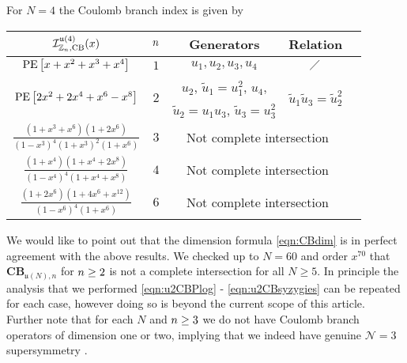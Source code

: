 \documentclass[main.tex]{subfiles}
\begin{document}
\vspace{0.1cm}
For $N=4$ the Coulomb branch index is given by
\vspace{0.1cm}
\begin{center}
\begin{tabular}{|c|c|c|c|c|}
\hline
$\mathcal{I}_{\mathbb{Z}_{n},\text{CB}}^{\mathfrak{u}(4)}(x)$&${n}$&Generators&Relation\\\hline
$\operatorname{\mathrm{PE}}\left[x+x^2+x^3+x^4\right]$ & $1$ &$u_1,u_2,u_3,u_4$&$\diagup$\\\hline
\multirow{ 2}{*}{$\operatorname{\mathrm{PE}}\left[2x^2+2x^4+x^6-x^8\right]$} & \multirow{ 2}{*}{$2$}&$u_2$, $\widetilde{u}_1=u_1^2$, $u_4$, &\multirow{ 2}{*}{$\widetilde{u}_1\widetilde{u}_3=\widetilde{u}_2^2$}\\
&&$\widetilde{u}_2=u_1u_3$, $\widetilde{u}_3=u_3^2$&\\\hline
$\frac{(1+x^3+x^6)(1+2x^6)}{(1-x^3)^4(1+x^3)^2(1+x^6)}$&$3$&\multicolumn{2}{c|}{Not complete intersection}\\\hline
$\frac{(1+x^4)(1+x^4+2x^8)}{\left(1-x^4\right)^4(1+x^4+x^8)}$&$4$&\multicolumn{2}{c|}{Not complete intersection}\\\hline
$\frac{(1+2x^6)(1+4x^6+x^{12})}{\left(1-x^6\right)^4(1+x^6)}$&$6$&\multicolumn{2}{c|}{Not complete intersection}\\\hline
\end{tabular}
\end{center}
\vspace{0.1cm}
We would like to point out that the dimension formula \eqref{eqn:CBdim} is in perfect agreement with the above results.
We checked up to $N=60$ and order $x^{70}$ that $\mathbf{CB}_{\mathfrak{u}(N),n}$ for $n\geq2$ is not a complete intersection for all $N\geq 5$. In principle the analysis that we performed \eqref{eqn:u2CBPlog} - \eqref{eqn:u2CBsyzygies} can be repeated for each case, however doing so is beyond the current scope of this article. Further note that for each $N$ and ${n}\geq3$ we do not have Coulomb branch operators of dimension one or two, implying that we indeed have genuine $\mathcal{N}=3$ supersymmetry \cite{Aharony:2015oyb}. 
\end{document}
